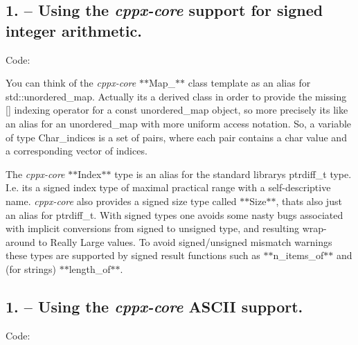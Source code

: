 \subsection*{1. – Using the {\itshape cppx-\/core} support for signed integer arithmetic.}

Code\+:


\begin{DoxyCode}{0}
\end{DoxyCode}


You can think of the {\itshape cppx-\/core} $\ast$$\ast${\ttfamily Map\+\_\+}$\ast$$\ast$ class template as an alias for {\ttfamily std\+::unordered\+\_\+map}. Actually it\textquotesingle{}s a derived class in order to provide the missing {\ttfamily \mbox{[}\mbox{]}} indexing operator for a {\ttfamily const} {\ttfamily unordered\+\_\+map} object, so more precisely it\textquotesingle{}s like an alias for an {\ttfamily unordered\+\_\+map} with more uniform access notation. So, a variable of type {\ttfamily Char\+\_\+indices} is a set of pairs, where each pair contains a {\ttfamily char} value and a corresponding {\ttfamily vector} of indices.

The {\itshape cppx-\/core} $\ast$$\ast${\ttfamily Index}$\ast$$\ast$ type is an alias for the standard library\textquotesingle{}s {\ttfamily ptrdiff\+\_\+t} type. I.\+e. it\textquotesingle{}s a signed index type of maximal practical range with a self-\/descriptive name. {\itshape cppx-\/core} also provides a signed size type called $\ast$$\ast${\ttfamily Size}$\ast$$\ast$, that\textquotesingle{}s also just an alias for {\ttfamily ptrdiff\+\_\+t}. With signed types one avoids some nasty bugs associated with implicit conversions from signed to unsigned type, and resulting wrap-\/around to Really Large\texttrademark{} values. To avoid signed/unsigned mismatch warnings these types are supported by signed result functions such as $\ast$$\ast${\ttfamily n\+\_\+items\+\_\+of}$\ast$$\ast$ and (for strings) $\ast$$\ast${\ttfamily length\+\_\+of}$\ast$$\ast$.

\subsection*{1. – Using the {\itshape cppx-\/core} A\+S\+C\+II support.}

Code\+:


\begin{DoxyCode}{0}
\DoxyCodeLine{\{}
\DoxyCodeLine{    \{}
\DoxyCodeLine{        \{}
\DoxyCodeLine{        \}}
\DoxyCodeLine{    \}}
\DoxyCodeLine{\}}
\end{DoxyCode}


